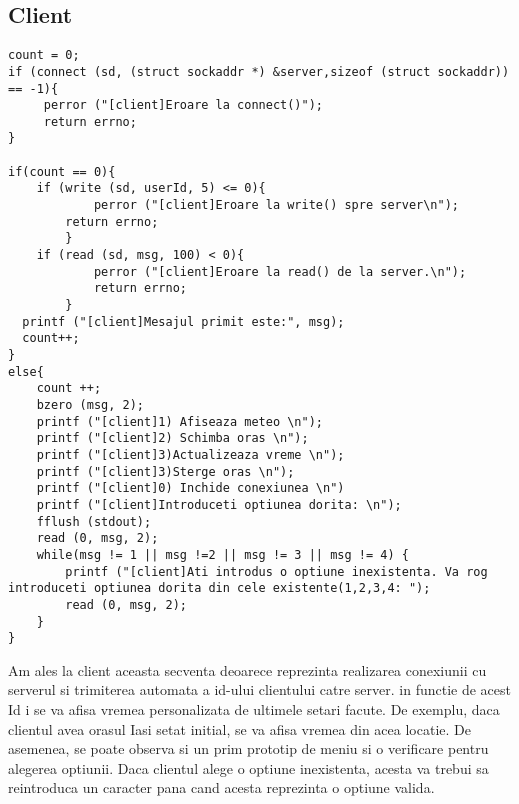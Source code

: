 \documentclass{llncs}
\begin{document}
\subsection{Client}
%
\begin{lstlisting}
count = 0;
if (connect (sd, (struct sockaddr *) &server,sizeof (struct sockaddr)) == -1){
	 perror ("[client]Eroare la connect()");
	 return errno;
}

if(count == 0){
	if (write (sd, userId, 5) <= 0){
     		perror ("[client]Eroare la write() spre server\n");
		return errno;
    	}
	if (read (sd, msg, 100) < 0){
      		perror ("[client]Eroare la read() de la server.\n");
      		return errno;
    	}
  printf ("[client]Mesajul primit este:", msg);
  count++;
}
else{
	count ++;
	bzero (msg, 2);
	printf ("[client]1) Afiseaza meteo \n");
	printf ("[client]2) Schimba oras \n");
	printf ("[client]3)Actualizeaza vreme \n");
	printf ("[client]3)Sterge oras \n");
	printf ("[client]0) Inchide conexiunea \n")
	printf ("[client]Introduceti optiunea dorita: \n");
	fflush (stdout);
	read (0, msg, 2);
	while(msg != 1 || msg !=2 || msg != 3 || msg != 4) {
		printf ("[client]Ati introdus o optiune inexistenta. Va rog introduceti optiunea dorita din cele existente(1,2,3,4: ");
		read (0, msg, 2);
	}
}
\end{lstlisting}
%
Am ales la client aceasta secventa deoarece reprezinta realizarea conexiunii cu serverul si trimiterea automata a id-ului clientului catre server.
in functie de acest Id i se va afisa vremea personalizata de ultimele setari facute. De exemplu, daca clientul avea orasul Iasi setat initial,
se va afisa vremea din acea locatie. De asemenea, se poate observa si un prim prototip de meniu si o verificare
pentru alegerea optiunii. Daca clientul alege o optiune inexistenta, acesta va trebui sa reintroduca un caracter pana cand acesta reprezinta o optiune valida.
%
\end{document}
